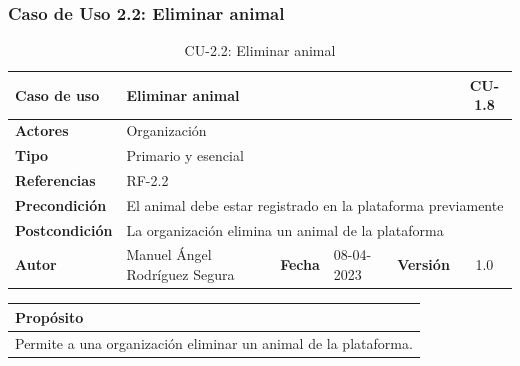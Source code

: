 \subsubsection{Caso de Uso 2.2: Eliminar animal}\label{subsubsec:eliminar-animal}

\begin{table}[H]
    \begin{center}
        \begin{adjustbox}{width=\textwidth}
            \begin{tabular}{ | l | l | l | l | c | c | }
                \hline
                \textbf{Caso de uso} & \multicolumn{4}{l|}{Eliminar animal} & \cellcolor{gray!50} \textbf{CU-1.8}\\
                \hline
                \textbf{Actores} & \multicolumn{5}{p{0.5\linewidth}|}{Organización} \\
                \hline
                \textbf{Tipo} & \multicolumn{5}{l|}{Primario y esencial} \\
                \hline
                \textbf{Referencias} & \multicolumn{3}{l|}{RF-2.2} & \multicolumn{2}{l|}{ }\\
                \hline
                \textbf{Precondición} & \multicolumn{5}{l|}{El animal debe estar registrado en la plataforma previamente} \\
                \hline
                \textbf{Postcondición} & \multicolumn{5}{l|}{La organización elimina un animal de la plataforma} \\
                \hline
                \textbf{Autor} & \multicolumn{1}{p{0.25\linewidth}|}{Manuel Ángel Rodríguez Segura} & \textbf{Fecha} &
                08-04-2023     & \textbf{Versión}                                                      & 1.0\\
                \hline
            \end{tabular}
        \end{adjustbox}
        \caption{CU-2.2: Eliminar animal}
        \label{tab:eliminar-animal}
    \end{center}
\end{table}

\begin{table}[H]
    \centering
    \begin{tabularx}{\textwidth}{@{} |L |@{}} \hline
        \textbf{Propósito} \\
        \hline
        Permite a una organización eliminar un animal de la plataforma. \\
        \hline
    \end{tabularx}
\end{table}


